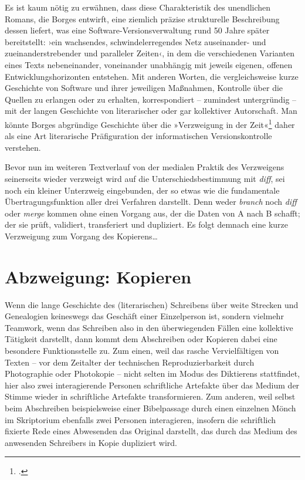 \documentclass[a4paper,11pt]{article}
\newcommand{\anf}[1]{»#1«}
\newcommand{\inanf}[1]{›#1‹}
\begin{document}
Es ist kaum nötig zu erwähnen, dass diese Charakteristik des unendlichen Romans, die Borges entwirft, eine ziemlich präzise strukturelle Beschreibung dessen liefert, was eine Software-Versionsverwaltung rund 50 Jahre später bereitstellt: \inanf{ein wachsendes, schwindelerregendes Netz auseinander- und zueinanderstrebender und paralleler Zeiten}, in dem die verschiedenen Varianten eines Texts nebeneinander, voneinander unabhängig mit jeweils eigenen, offenen Entwicklungshorizonten entstehen. Mit anderen Worten, die vergleichsweise kurze Geschichte von Software und ihrer jeweiligen Maßnahmen, Kontrolle über die Quellen zu erlangen oder zu erhalten, korrespondiert – zumindest untergründig – mit der langen Geschichte von literarischer oder gar kollektiver Autorschaft. Man könnte Borges abgründige Geschichte über die \anf{Verzweigung in der Zeit}\footcite[169]{borges:1941} daher als eine Art literarische Präfiguration der informatischen Versionskontrolle verstehen. 

Bevor nun im weiteren Textverlauf von der medialen Praktik des Verzweigens seinerseits wieder verzweigt wird auf die Unterschiedsbestimmung mit \emph{diff}, sei noch ein kleiner Unterzweig eingebunden, der so etwas wie die fundamentale Übertragungsfunktion aller drei Verfahren darstellt. Denn weder \emph{branch} noch \emph{diff} oder \emph{merge} kommen ohne einen Vorgang aus, der die Daten von A nach B schafft; der sie prüft, validiert, transferiert und dupliziert. Es folgt demnach eine kurze Verzweigung zum Vorgang des Kopierens\ldots


\section*{Abzweigung: Kopieren}

Wenn die lange Geschichte des (literarischen) Schreibens über weite Strecken und Genealogien keineswegs das Geschäft einer Einzelperson ist, sondern vielmehr Teamwork, wenn das Schreiben also in den überwiegenden Fällen eine kollektive Tätigkeit darstellt, dann kommt dem Abschreiben oder Kopieren dabei eine besondere Funktionsstelle zu. Zum einen, weil das rasche Vervielfältigen von Texten – vor dem Zeitalter der technischen Reproduzierbarkeit durch Photographie oder Photokopie – nicht selten im Modus des Diktierens stattfindet, hier also zwei interagierende Personen schriftliche Artefakte über das Medium der Stimme wieder in schriftliche Artefakte transformieren. Zum anderen, weil selbst beim Abschreiben beispielsweise einer Bibelpassage durch einen einzelnen Mönch im Skriptorium ebenfalls zwei Personen interagieren, insofern die schriftlich fixierte Rede eines Abwesenden das Original darstellt, das durch das Medium des anwesenden Schreibers in Kopie dupliziert wird. 
\end{document}
